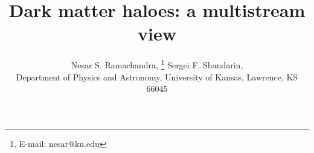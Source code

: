 \documentclass[fleqn,usenatbib,useAMS]{mnras}
\begin{document}
\label{firstpage}
\pagerange{\pageref{firstpage}--\pageref{lastpage}}

\title[Dark matter haloes: a multistream view]{Dark matter haloes: a multistream view}

\author[Ramachandra \& Shandarin]
	{Nesar S. Ramachandra, \thanks{E-mail: nesar@ku.edu} 
	Sergei F. Shandarin, \\
	Department of Physics and Astronomy, University of Kansas, Lawrence, KS 66045}



\maketitle
\end{document}
